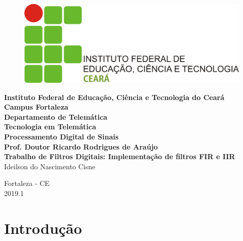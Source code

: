 \documentclass[12pt,fleqn]{article}
\begin{document}
\pagestyle {empty}


\begin{figure}[!htb]
    \centering
    \includegraphics[scale=0.6]{fig/IFCE.jpg}
\end{figure}

{\begin{center}
\large
{\bf
Instituto Federal de Educação, Ciência e Tecnologia do Ceará \\
Campus Fortaleza\\
Departamento de Telemática\\
Tecnologia em Telemática\\[3cm]
Processamento Digital de Sinais \\ 
Prof. Doutor Ricardo Rodrigues de Araújo \\
Trabalho de Filtros Digitais: Implementação de filtros FIR e IIR } \\[3cm]
Ideilson do Nascimento Cisne\\
\end{center}}

\vfill
\begin{center} 
Fortaleza - CE \\
2019.1
\end{center}


\newpage
\tableofcontents
\pagestyle {plain}
\setcounter{page}{0} 


\newpage
\section{Introdução}
\end{document}
